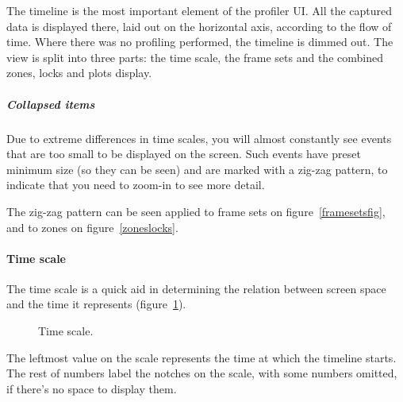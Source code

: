 \documentclass[hidelinks,titlepage,a4paper]{article}
\begin{document}
The timeline is the most important element of the profiler UI. All the captured data is displayed there, laid out on the horizontal axis, according to the flow of time. Where there was no profiling performed, the timeline is dimmed out. The view is split into three parts: the time scale, the frame sets and the combined zones, locks and plots display.

\subparagraph{Collapsed items}
\label{collapseditems}

Due to extreme differences in time scales, you will almost constantly see events that are too small to be displayed on the screen. Such events have preset minimum size (so they can be seen) and are marked with a zig-zag pattern, to indicate that you need to zoom-in to see more detail.

The zig-zag pattern can be seen applied to frame sets on figure~\ref{framesetsfig}, and to zones on figure~\ref{zoneslocks}.

\paragraph{Time scale}

The time scale is a quick aid in determining the relation between screen space and the time it represents (figure~\ref{timescale}).

\begin{figure}[h]
\centering{}
\caption{Time scale.}
\label{timescale}
\end{figure}

The leftmost value on the scale represents the time at which the timeline starts. The rest of numbers label the notches on the scale, with some numbers omitted, if there's no space to display them.
\end{document}
